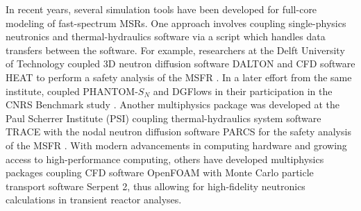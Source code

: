 In recent years, several simulation tools have been developed for full-core
modeling of fast-spectrum \glspl{MSR}. One approach involves coupling
single-physics neutronics and thermal-hydraulics software via a script which
handles data transfers between the software. For example, researchers at
the Delft University of Technology coupled 3D neutron diffusion software
DALTON \citep{boer_validation_2010} and CFD software HEAT
\citep{de_zwaan_static_2007} to perform a safety analysis of the \gls{MSFR}
\citep{fiorina_modelling_2014}. In a later effort from the same institute,
\cite{tiberga_discontinuous_2019} coupled PHANTOM-$S_N$ and DGFlows
in their participation in the
CNRS Benchmark study \citep{tiberga_results_2020}. Another multiphysics
package was developed at the Paul Scherrer Institute (PSI) coupling
thermal-hydraulics system software TRACE \citep{nrc_trace_2007} with the nodal
neutron diffusion software PARCS \citep{downar_parcs_2010} for the safety
analysis of the \gls{MSFR} \citep{pettersen_coupled_2016}. With modern
advancements in computing hardware and growing access to high-performance
computing, others \citep{laureau_transient_2017,blanco_neutronic_2020} have
developed multiphysics packages coupling CFD software
OpenFOAM with Monte Carlo particle transport software Serpent 2, thus allowing
for high-fidelity neutronics calculations in transient reactor analyses.


